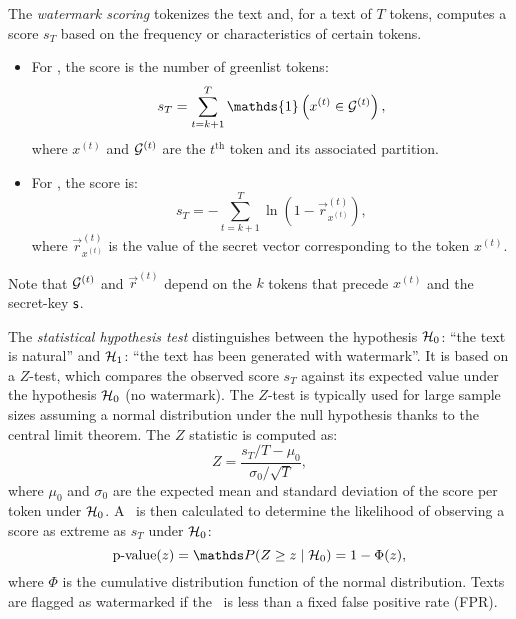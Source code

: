 The \emph{watermark scoring} tokenizes the text and, for a text of $T$ tokens, computes a score $s_T$  based on the frequency or characteristics of certain tokens.
\begin{itemize}
    \item For \citet{kirchenbauer2023watermark}, the score is the number of greenlist tokens:
    \begin{equation}
        s_T = \sum_{t=k+1}^T \mathds{1} \left(x^{(t)}\in\G^{(t)}\right),
    \end{equation}\label{chap5/eq:score-kirchenbauer}
    where $x^{(t)}$ and $\mathcal{G}^{(t)}$ are the $t^{\textrm{th}}$ token and its associated partition.
    \item For \citet{aaronson2023watermarking}, the score is:
    \begin{equation}
        s_T=-\sum_{t=k+1}^T \ln \left(1-\vec{r}^{(t)}_{x^{(t)}}\right),
    \end{equation}\label{chap5/eq:score-aaronson}
    where $\vec{r}^{(t)}_{x^{(t)}}$ is the value of the secret vector corresponding to the token $x^{(t)}$.
\end{itemize}
Note that $\mathcal{G}^{(t)}$ and $\vec{r}^{(t)}$ depend on the $k$ tokens that precede $x^{(t)}$ and the secret-key $\mathsf{s}$.

The \emph{statistical hypothesis test} distinguishes between the hypothesis $\mathcal{H}_0$: ``the text is natural'' and $\mathcal{H}_1$: ``the text has been generated with watermark''.
It is based on a $Z$-test, which compares the observed score $s_T$ against its expected value under the hypothesis $\mathcal{H}_0$ (no watermark).
The $Z$-test is typically used for large sample sizes assuming a normal distribution under the null hypothesis thanks to the central limit theorem.  
The $Z$ statistic is computed as:
\begin{equation}
    Z = \frac{{s_T/T - \mu_0}}{{\sigma_0 / \sqrt{T}}},
    \label{chap5/eq:Z}
\end{equation}
where $\mu_0$ and $\sigma_0$ are the expected mean and standard deviation of the score per token under $\mathcal{H}_0$.
A \pval\ is then calculated to determine the likelihood of observing a score as extreme as $s_T$ under $\mathcal{H}_0$:
\begin{equation}
    \text{p-value}(z) = \Prob(Z \geq z \mid \H_0) = 1 - \Phi(z),
    \label{chap5/eq:pvalue}
\end{equation}
where $\Phi$ is the cumulative distribution function of the normal distribution. 
Texts are flagged as watermarked if the \pval\ is less than a fixed false positive rate (FPR).













 













